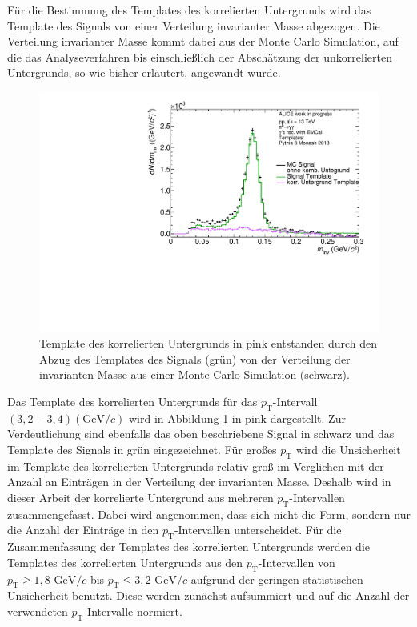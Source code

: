 F\"ur die Bestimmung des Templates des korrelierten Untergrunds wird das Template des Signals von einer Verteilung invarianter Masse abgezogen.
Die Verteilung invarianter Masse kommt dabei aus der Monte Carlo Simulation, auf die das Analyseverfahren bis einschlie{\ss}lich der Absch\"atzung der unkorrelierten Untergrunds, so wie bisher erl\"autert, angewandt wurde.
\begin{figure}[tp]
\centering
\includegraphics[width=.75\linewidth]{EntstehungUntergrund10_Data_2016.pdf}
\caption{Template des korrelierten Untergrunds in pink entstanden durch den Abzug des Templates des Signals (gr\"un) von der Verteilung der invarianten Masse aus einer Monte Carlo Simulation (schwarz).}
\label{fig:BkgTemp}
\end{figure}
\newline
Das Template des korrelierten Untergrunds f\"ur das $p_\text{T}$-Intervall $(3,2 - 3,4) (\text{GeV/}c)$ wird in Abbildung \ref{fig:BkgTemp} in pink dargestellt.
Zur Verdeutlichung sind ebenfalls das oben beschriebene Signal in schwarz und das Template des Signals in gr\"un eingezeichnet.
\newline
F\"ur gro{\ss}es $p_\text{T}$ wird die Unsicherheit im Template des korrelierten Untergrunds relativ gro{\ss} im Verglichen mit der Anzahl an Eintr\"agen in der Verteilung der invarianten Masse.
Deshalb wird in dieser Arbeit der korrelierte Untergrund aus mehreren $p_\text{T}$-Intervallen zusammengefasst.
Dabei wird angenommen, dass sich nicht die Form, sondern nur die Anzahl der Eintr\"age in den $p_\text{T}$-Intervallen unterscheidet.  
F\"ur die Zusammenfassung der Templates des korrelierten Untergrunds werden die Templates des korrelierten Untergrunds aus den $p_\text{T}$-Intervallen von $p_\text{T} \geq 1,8\text{ GeV}/c$ bis $p_\text{T} \leq 3,2\text{ GeV}/c$ aufgrund der geringen statistischen Unsicherheit benutzt.
Diese werden zun\"achst aufsummiert und auf die Anzahl der verwendeten $p_\text{T}$-Intervalle normiert.
